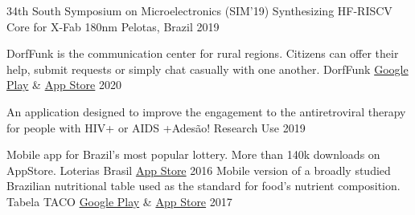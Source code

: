 

\begin{cventries}
  \cvcompactentry
    {34th South Symposium on Microelectronics (SIM'19)}
    {Synthesizing HF-RISCV Core for X-Fab 180nm}
    {Pelotas, Brazil}
    {2019}
\end{cventries}


\begin{cventries}

  \cvcompactentry
    {DorfFunk is the communication center for rural regions. Citizens can offer their help, submit requests or simply chat casually with one another.}
    {DorfFunk}
    {\href{https://play.google.com/store/apps/details?id=de.fhg.iese.dd.dorffunk.android&hl=pt_BR&gl=US}{Google Play} \& \href{https://apps.apple.com/app/id1348748008}{App Store} }
    {2020}

    \cvcompactentry
    {An application designed to improve the engagement to the antiretroviral therapy for people with HIV+ or AIDS}
    {+Adesão!}
    {Research Use}
    {2019}

  \cvcompactentry
    {Mobile app for Brazil’s most popular lottery. More than 140k downloads on AppStore.}
    {Loterias Brasil}
    {\href{https://apps.apple.com/app/id992505562}{App Store}}
    {2016}
  \cvcompactentry
    {Mobile version of a broadly studied Brazilian nutritional table used as the standard for food’s nutrient composition.}
    {Tabela TACO}
    {\href{https://play.google.com/store/apps/details?id=rodrigo.TabelaTaco&hl=pt_BR&gl=US}{Google Play} \& \href{https://apps.apple.com/app/id1066079092}{App Store} }
    {2017}
  
\end{cventries}
